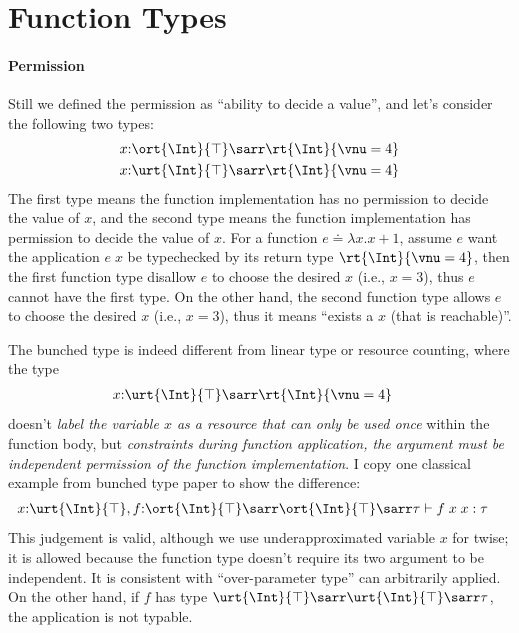 \section{Function Types}

\paragraph{Permission} Still we defined the permission as ``ability to decide a value'', and let's consider the following two types:
\begin{align*}
    &x{:}\ort{\Int}{\top} \sarr \rt{\Int}{\vnu = 4} \\
    &x{:}\urt{\Int}{\top} \sarr \rt{\Int}{\vnu = 4}
\end{align*}\noindent
The first type means the function implementation has no permission to decide the value of $x$, and the second type means the function implementation has permission to decide the value of $x$. For a function $e \doteq \lambda x.x + 1$, assume $e$ want the application $e\;x$ be typechecked by its return type $\rt{\Int}{\vnu = 4}$, then the first function type disallow $e$ to choose the desired $x$ (i.e., $x = 3$), thus $e$ cannot have the first type. On the other hand, the second function type allows $e$ to choose the desired $x$ (i.e., $x = 3$), thus it means ``exists a $x$ (that is reachable)''.

The bunched type is indeed different from linear type or resource counting, where the type
\begin{align*}
    &x{:}\urt{\Int}{\top} \sarr \rt{\Int}{\vnu = 4}
\end{align*}\noindent
doesn't \emph{label the variable $x$ as a resource that can only be used once} within the function body, but \emph{constraints during function application, the argument must be independent permission of the function implementation}. I copy one classical example from bunched type paper to show the difference:
\begin{align*}
    &x{:}\urt{\Int}{\top}, f{:}\ort{\Int}{\top} \sarr \ort{\Int}{\top} \sarr \tau \vdash f\;x\;x : \tau
\end{align*}\noindent
This judgement is valid, although we use underapproximated variable $x$ for twise; it is allowed because the function type doesn't require its two argument to be independent. It is consistent with ``over-parameter type'' can arbitrarily applied. On the other hand, if $f$ has type $\urt{\Int}{\top} \sarr \urt{\Int}{\top} \sarr \tau$, the application is not typable.

